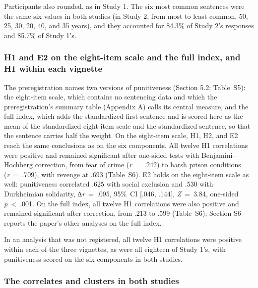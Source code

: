 Participants also rounded, as in Study 1. The six most common sentences were the same six values in both studies (in Study 2, from most to least common, 50, 25, 30, 20, 40, and 35 years), and they accounted for 84.3\% of Study 2's responses and 85.7\% of Study 1's.

\subsubsection{H1 and E2 on the eight-item scale and the full index, and H1 within each vignette}\label{h1-and-e2-on-the-eight-item-scale-and-the-full-index-and-h1-within-each-vignette}

The preregistration names two versions of punitiveness (Section 5.2; Table~S5): the eight-item scale, which contains no sentencing data and which the preregistration's summary table (Appendix A) calls its central measure, and the full index, which adds the standardized first sentence and is scored here as the mean of the standardized eight-item scale and the standardized sentence, so that the sentence carries half the weight. On the eight-item scale, H1, H2, and E2 reach the same conclusions as on the six components. All twelve H1 correlations were positive and remained significant after one-sided tests with Benjamini--Hochberg correction, from fear of crime (\emph{r}~=~.242) to harsh prison conditions (\emph{r}~=~.709), with revenge at .693 (Table~S6). E2 holds on the eight-item scale as well: punitiveness correlated .625 with social exclusion and .530 with Durkheimian solidarity, ∆\emph{r}~=~.095, 95\%~CI {[}.046, .144{]}, \emph{Z}~=~3.84, one-sided \emph{p}~\textless{}~.001. On the full index, all twelve H1 correlations were also positive and remained significant after correction, from .213 to .599 (Table~S6); Section S6 reports the paper's other analyses on the full index.

In an analysis that was not registered, all twelve H1 correlations were positive within each of the three vignettes, as were all eighteen of Study 1's, with punitiveness scored on the six components in both studies.

\subsubsection{The correlates and clusters in both studies}\label{the-correlates-and-clusters-in-both-studies}

